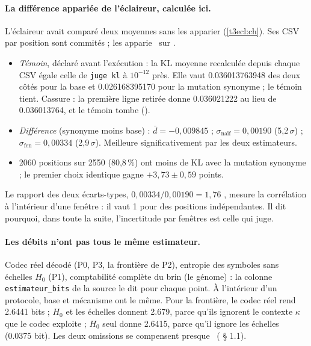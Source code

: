 \paragraph{La différence appariée de l'éclaireur, calculée ici.} L'éclaireur avait comparé deux moyennes sans les apparier (\cref{t3ecl:ch}). Ses CSV par position sont commités ;  les apparie \calc~sur \mes.
\begin{itemize}
\item \emph{Témoin}, déclaré avant l'exécution : la KL moyenne recalculée depuis chaque CSV égale celle de \texttt{juge kl} à $10^{-12}$ près. Elle vaut \num{0.036013763948} des deux côtés pour la base et \num{0.026168395170} pour la mutation synonyme ; le témoin tient. Cassure : la première ligne retirée donne \num{0.036021222} au lieu de \num{0.036013764}, et le témoin tombe ().
\item \emph{Différence} (synonyme moins base) : $\bar d = -0{,}009845$ ; $\sigma_{\text{naïf}} = 0{,}00190$ (5,2\,$\sigma$) ; $\sigma_{\text{fen}} = 0{,}00334$ (2,9\,$\sigma$). Meilleure significativement par les deux estimateurs.
\item \num{2060} positions sur \num{2550} (80,8\,\%) ont moins de KL avec la mutation synonyme ; le premier choix identique gagne $+3{,}73 \pm 0{,}59$ points.
\end{itemize}
Le rapport des deux écarts-types, $0{,}00334/0{,}00190 = 1{,}76$ \calc, mesure la corrélation à l'intérieur d'une fenêtre : il vaut 1 pour des positions indépendantes. Il dit pourquoi, dans toute la suite, l'incertitude par fenêtres est celle qui juge.

\paragraph{Les débits n'ont pas tous le même estimateur.} Codec réel décodé (P0, P3, la frontière de P2), entropie des symboles sans échelles $H_0$ (P1), comptabilité complète du brin (le génome) : la colonne \texttt{estimateur\_bits} de la source le dit pour chaque point. À l'intérieur d'un protocole, base et mécanisme ont le même. Pour la frontière, le codec réel rend \num{2.6441} bits ; $H_0$ et les échelles donnent \num{2.679}, parce qu'ils ignorent le contexte $\kappa$ que le codec exploite ; $H_0$ seul donne \num{2.6415}, parce qu'il ignore les échelles (\num{0.0375} bit). Les deux omissions se compensent presque \calc~( § 1.1).

